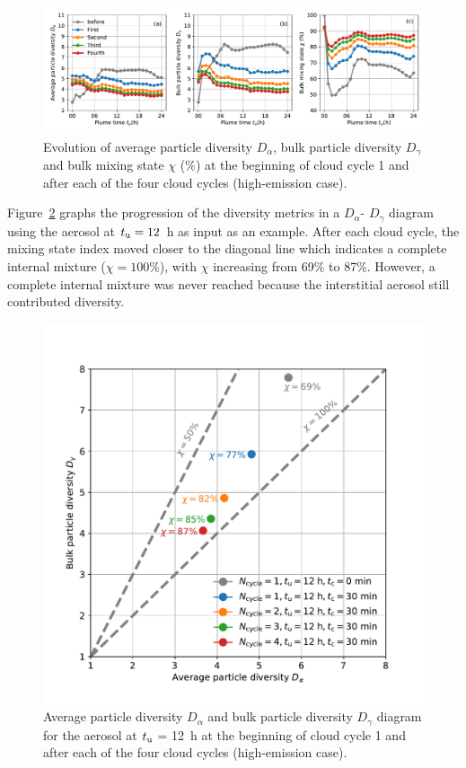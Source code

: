 \documentclass[edeposit,fullpage]{uiucthesis2009}
\begin{document}
\begin{figure}
    \centering
    \includegraphics[scale=0.43]{chap3_figs/fig8.pdf}
    \caption{Evolution of average particle diversity $D_{\alpha}$,
      bulk particle diversity $D_{\gamma}$ and bulk mixing state
      $\chi$ ($\%$) at the beginning of cloud cycle 1 and after each
      of the four cloud cycles (high-emission case).}
    \label{fig:bulk_chi}
\end{figure}

Figure~\ref{fig:chi_diagram} graphs the progression of the diversity
metrics in a $D_{\alpha}$- $D_{\gamma}$ diagram using the aerosol at
$t_{\rm u} = 12$~h as input as an example. After each cloud cycle, the
mixing state index moved closer to the diagonal line which indicates a
complete internal mixture ($\chi = 100$\%), with $\chi$ increasing from
69\% to 87\%. However, a complete internal mixture was never reached
because the interstitial aerosol still contributed diversity.

\begin{figure}
    \centering
    \includegraphics[scale=0.43]{chap3_figs/fig9.pdf}
    \caption{Average particle diversity $D_{\alpha}$ and bulk particle
      diversity $D_{\gamma}$ diagram for the aerosol at $t_{\rm u}$ =
      12~h at the beginning of cloud cycle 1 and after each of the
      four cloud cycles (high-emission case). }
    \label{fig:chi_diagram}
\end{figure}
\end{document}
